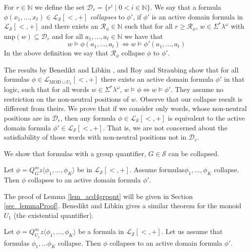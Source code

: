\documentclass[envcountsame]{llncs}
\newcommand{\Nat}{\mathbb{N}}
\newcommand{\mon}[2]{Q_{#1}^{#2}}
\newcommand{\nnp}{\mathrm{nnp}}
\newcommand{\MOD}{\mathrm{MOD}}
\begin{document}
For $r\in\mathbb N$ we define the set $\mathcal{D}_r = \{r^i \mid 0<i \in \Nat\}$. We say that a formula $\phi(x_1,\dots,x_t) \in
\mathcal{L_S}[<,+]$ \emph{collapses} to $\phi'$, if $\phi'$ is an active domain formula in $\mathcal{L_S}[<,+]$ and there exists an 
$\mathcal{R}_{\phi} \in \Nat$ such that for all $r \geq \mathcal{R}_{\phi}$, $w\in \Sigma^*\lambda^{\omega}$ with 
$\nnp(w) \subseteq \mathcal{D}_r$ and for all $a_1,\dots,a_t \in \Nat$ we have that 
$$w \models \phi(a_1,\dots,a_t) \Leftrightarrow w \models \phi'(a_1,\dots,a_t)$$ 
In the above definition we say that $\mathcal{R}_{\phi}$ collapse $\phi$ to $\phi'$.

The results by Benedikt and Libkin \cite{libkin_relIntrStruc}, and Roy and Straubing \cite{roy_defGenFO} show that for all formulas $\phi \in \mathcal{L}_{\MOD \cup U_1}[<,+]$ 
there exists an active domain formula $\phi'$ in that logic, such that for all words $w \in \Sigma^*\lambda^{\omega}$, $w \vDash \phi \Leftrightarrow w \vDash \phi'$. 
They assume no restriction on the non-neutral positions of $w$. Observe that our collapse result is different from theirs. We prove that if we consider only words, 
whose non-neutral positions are in $\mathcal{D}_r$, then any formula $\phi \in \mathcal{L_S}[<,+]$ is equivalent to the active domain
formula $\phi' \in \mathcal{L_S}[<,+]$. 
That is, we are not concerned about the satisfiability of those words with non-neutral positions not in $\mathcal{D}_r$.

We show that formulas with a group quantifier, $G \in \mathcal{S}$ can be collapsed.
\begin{lemma}
 \label{lem_acd4grpqnt}
Let $\phi = \mon{G}{m} z \langle \phi_1,\dots,\phi_K \rangle$ be in $\mathcal{L_S}[<,+]$. Assume formulas\linebreak $\phi_1,\dots,\phi_K$
collapse. Then $\phi$ collapses to an active domain formula $\phi'$.
\end{lemma}

The proof of Lemma \ref{lem_acd4grpqnt} will be given in Section \ref{sec_lemmaProof}. 
Benedikt and Libkin \cite{libkin_relIntrStruc} gives a similar theorem for the monoid $U_1$ (the existential quantifier).
\begin{lemma}
 \label{lem_acd4u1}
Let $\phi = \mon{U_1}{m} z \langle \phi_1,\dots,\phi_K \rangle$ be a formula in $\mathcal{L_S}[<,+]$. Let us assume that formulas
$\phi_1,\dots \phi_K$ collapse. Then $\phi$ collapses to an active domain formula $\phi'$.
\end{lemma}
\end{document}
